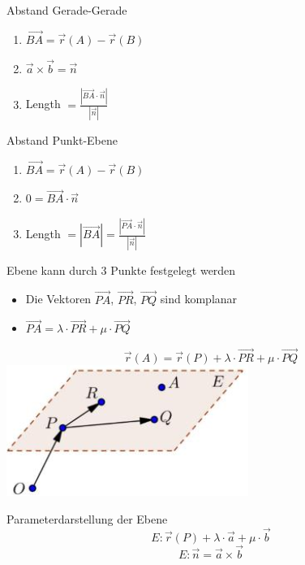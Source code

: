 \begin{KR}{Abstand Gerade-Gerade}
    \begin{enumerate}
        \item $\overrightarrow{BA} = \overrightarrow{r}(A) - \overrightarrow{r}(B)$
        \item $\overrightarrow{a} \times \overrightarrow{b} = \overrightarrow{n}$
        \item Length $= \frac{|\overrightarrow{BA} \cdot \overrightarrow{n}|}{|\overrightarrow{n}|}$
    \end{enumerate}
\end{KR}

\begin{KR}{Abstand Punkt-Ebene}
    \begin{enumerate}
        \item $\overrightarrow{BA} = \overrightarrow{r}(A) - \overrightarrow{r}(B)$
        \item $0 = \overrightarrow{BA} \cdot \overrightarrow{n}$
        \item Length $= |\overrightarrow{BA}| = \frac{|\overrightarrow{PA} \cdot \overrightarrow{n}|}{|\overrightarrow{n}|}$
    \end{enumerate}
\end{KR}

\begin{definition}{Ebene}
    kann durch 3 Punkte festgelegt werden
    \begin{itemize}
        \item Die Vektoren $\overrightarrow{PA}$, $\overrightarrow{PR}$, $\overrightarrow{PQ}$ sind komplanar
        \item $\overrightarrow{PA} = \lambda \cdot \overrightarrow{PR} + \mu \cdot \overrightarrow{PQ}$
    \end{itemize}
    $$\overrightarrow{r}(A) = \overrightarrow{r}(P) + \lambda \cdot \overrightarrow{PR} + \mu \cdot \overrightarrow{PQ}$$
    \includegraphics[width=0.3\linewidth]{ebene.png}
\end{definition}

\begin{concept}{Parameterdarstellung} der Ebene
    $$E: \overrightarrow{r}(P) + \lambda \cdot \overrightarrow{a} + \mu \cdot \overrightarrow{b}$$
    $$E: \overrightarrow{n} = \overrightarrow{a} \times \overrightarrow{b}$$
\end{concept}
    
